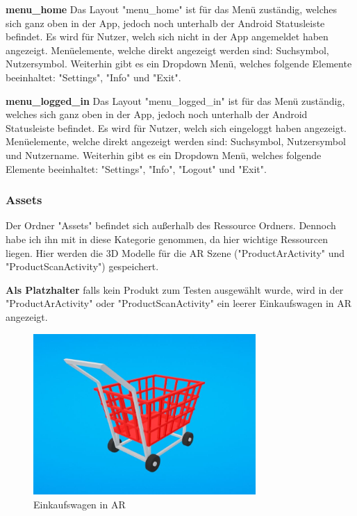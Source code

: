 \documentclass{scrartcl}
\begin{document}
\noindent \textbf{menu\_home \newline}
\noindent Das Layout "menu\_home" ist für das Menü zuständig, welches sich ganz oben in der App, jedoch noch unterhalb der Android Statusleiste befindet. Es wird für Nutzer, welch sich nicht in der App angemeldet haben angezeigt. Menüelemente, welche direkt angezeigt werden sind: Suchsymbol, Nutzersymbol. Weiterhin gibt es ein Dropdown Menü, welches folgende Elemente beeinhaltet: "Settings", "Info" und "Exit". \newline

\noindent \textbf{menu\_logged\_in \newline}
\noindent Das Layout "menu\_logged\_in" ist für das Menü zuständig, welches sich ganz oben in der App, jedoch noch unterhalb der Android Statusleiste befindet. Es wird für Nutzer, welch sich eingeloggt haben angezeigt. Menüelemente, welche direkt angezeigt werden sind: Suchsymbol, Nutzersymbol und Nutzername. Weiterhin gibt es ein Dropdown Menü, welches folgende Elemente beeinhaltet: "Settings", "Info", "Logout" und "Exit". \newline

\newpage 

\subsubsection{Assets}

Der Ordner "Assets" befindet sich außerhalb des Ressource Ordners. Dennoch habe ich ihn mit in diese Kategorie genommen, da hier wichtige Ressourcen liegen. Hier werden die 3D Modelle für die AR Szene ("ProductArActivity" und "ProductScanActivity") gespeichert. \newline 

\noindent \textbf{Als Platzhalter} falls kein Produkt zum Testen ausgewählt wurde, wird in der "ProductArActivity" oder "ProductScanActivity" ein leerer Einkaufswagen in AR angezeigt. \newline 
\begin{figure}[h]
\centering
\includegraphics[width=320px]{img/cart.JPG}
\caption{Einkaufswagen in AR}
\end{figure}
\end{document}
